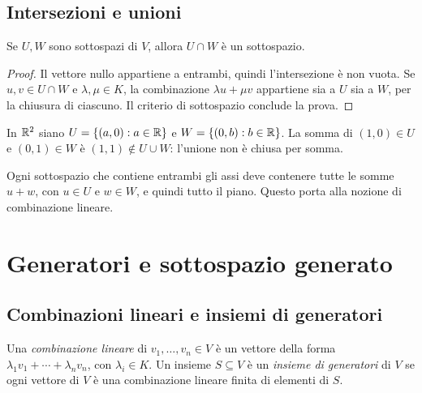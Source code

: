 \subsection{Intersezioni e unioni}

\begin{proposizione}
Se $U,W$ sono sottospazi di $V$, allora $U\cap W$ è un sottospazio.
\end{proposizione}
\begin{proof}
Il vettore nullo appartiene a entrambi, quindi l'intersezione è non vuota. Se $u,v\in U\cap W$ e $\lambda,\mu\in K$, la combinazione $\lambda u+\mu v$ appartiene sia a $U$ sia a $W$, per la chiusura di ciascuno. Il criterio di sottospazio conclude la prova.
\end{proof}

\begin{esempio}
In $\mathbb{R}^2$ siano $U=\{(a,0):a\in\mathbb{R}\}$ e $W=\{(0,b):b\in\mathbb{R}\}$. La somma di $(1,0)\in U$ e $(0,1)\in W$ è $(1,1)\notin U\cup W$: l'unione non è chiusa per somma.
\end{esempio}
\begin{schema}
\end{schema}

Ogni sottospazio che contiene entrambi gli assi deve contenere tutte le somme $u+w$, con $u\in U$ e $w\in W$, e quindi tutto il piano. Questo porta alla nozione di combinazione lineare.

\section{Generatori e sottospazio generato}
\subsection{Combinazioni lineari e insiemi di generatori}

\begin{definizione}
Una \emph{combinazione lineare} di $v_1,\ldots,v_n\in V$ è un vettore della forma $\lambda_1v_1+\cdots+\lambda_nv_n$, con $\lambda_i\in K$. Un insieme $S\subseteq V$ è un \emph{insieme di generatori} di $V$ se ogni vettore di $V$ è una combinazione lineare finita di elementi di $S$.
\end{definizione}


